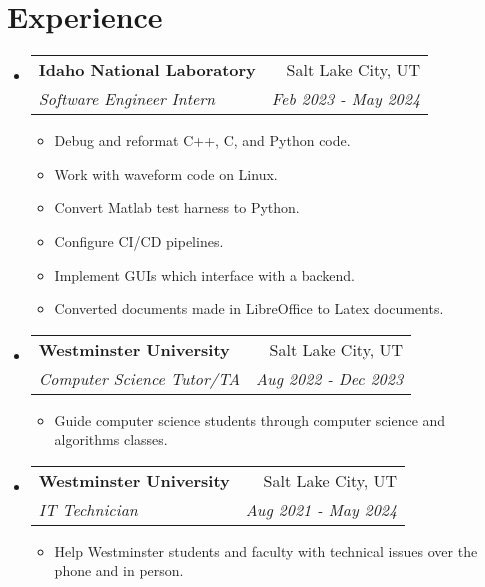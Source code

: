 \documentclass[letterpaper,11pt]{article}
\makeatletter
\newcommand{\resumeSubheading}[4]{
\vspace{-1pt}\item[]
    \begin{tabular*}{0.97\textwidth}{l@{\extracolsep{\fill}}r}
      \textbf{#1} & #2 \\
      \textit{\small#3} & \textit{\small #4} \\
    \end{tabular*}\vspace{-5pt}
}
\newcommand{\resumeSubHeadingListStart}{\begin{itemize}[leftmargin=*]}
\newcommand{\resumeSubHeadingListEnd}{\end{itemize}}
\makeatother
\begin{document}
\section{Experience}
  \resumeSubHeadingListStart
    \resumeSubheading
      {Idaho National Laboratory}{Salt Lake City, UT}
      {Software Engineer Intern}{Feb 2023 - May 2024}
      \begin{itemize}[before=\vspace{-0.85em},after=\vspace{-1em}]
          \small 
          \itemsep 0.0em
          \item Debug and reformat C++, C, and Python code.
          \item Work with waveform code on Linux.
          \item Convert Matlab test harness to Python.
          \item Configure CI/CD pipelines.
          \item Implement GUIs which interface with a backend.
          \item Converted documents made in LibreOffice to Latex documents.
      \end{itemize}

    \resumeSubheading
      {Westminster University}{Salt Lake City, UT}
      {Computer Science Tutor/TA}{Aug 2022 - Dec 2023}
      \begin{itemize}[before=\vspace{-0.85em},after=\vspace{-1em}]
          \small 
          \item Guide computer science students through computer science and algorithms classes.
      \end{itemize}

    \resumeSubheading
      {Westminster University}{Salt Lake City, UT}
      {IT Technician}{Aug 2021 - May 2024}
      \begin{itemize}[before=\vspace{-0.85em},after=\vspace{-1em}]
          \small 
          \item Help Westminster students and faculty with technical issues over the phone and in person.
      \end{itemize}
  \resumeSubHeadingListEnd


\end{document}
